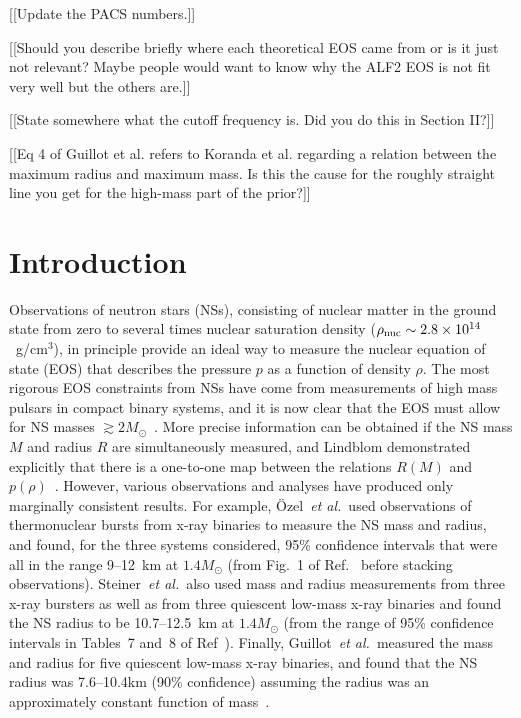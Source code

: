 \documentclass[twocolumn,prd,amssymb,aps,nofootinbib,showpacs,epsf]{revtex4}
\begin{document}
\maketitle

[[Update the PACS numbers.]]

[[Should you describe briefly where each theoretical EOS came from or is it just not relevant? Maybe people would want to know why the ALF2 EOS is not fit very well but the others are.]]

[[State somewhere what the cutoff frequency is. Did you do this in Section II?]]

[[Eq 4 of Guillot et al. refers to Koranda et al. regarding a relation between the maximum radius and maximum mass. Is this the cause for the roughly straight line you get for the high-mass part of the prior?]]

\section{Introduction}

Observations of neutron stars (NSs), consisting of nuclear matter in the ground state from zero to several times nuclear saturation density ($\rho_{\rm nuc}\sim2.8\times 10^{14}$~g/cm$^3$), in principle provide an ideal way to measure the nuclear equation of state (EOS) that describes the pressure $p$ as a function of density $\rho$. The most rigorous EOS constraints from NSs have come from measurements of high mass pulsars in compact binary systems, and it is now clear that the EOS must allow for NS masses $\gtrsim 2 M_\odot$~\cite{DemorestPennucciRansom2010, AntoniadisFreireWex2013}. More precise information can be obtained if the NS mass $M$ and radius $R$ are simultaneously measured, and Lindblom demonstrated explicitly that there is a one-to-one map between the relations $R(M)$ and $p(\rho)$~\cite{Lindblom1992}. However, various observations and analyses have produced only marginally consistent results. For example, \"Ozel~{\it et al.}\ used observations of thermonuclear bursts from x-ray binaries to measure the NS mass and radius, and found, for the three systems considered, 95\% confidence intervals that were all in the range 9--12~km at $1.4M_\odot$ (from Fig.~1 of Ref.~\cite{OzelBaymGuver2010} before stacking observations). Steiner~{\it et al.}\ also used mass and radius measurements from three x-ray bursters as well as from three quiescent low-mass x-ray binaries and found the NS radius to be 10.7--12.5~km at $1.4M_\odot$ (from the range of 95\% confidence intervals in Tables~7 and~8 of Ref~\cite{SteinerLattimerBrown2010}). Finally, Guillot~{\it et al.}\ measured the mass and radius for five quiescent low-mass x-ray binaries, and found that the NS radius was 7.6--10.4km (90\% confidence) assuming the radius was an approximately constant function of mass~\cite{GuillotServillatWebb2013}.
\end{document}
